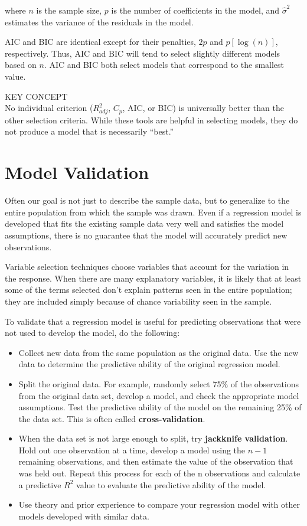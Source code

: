 \documentclass[
]{report}
\begin{document}
where \(n\) is the sample size, \(p\) is the number of coefficients in the model, and \(\hat{\sigma}^2\) estimates the variance of the residuals in the model.

AIC and BIC are identical except for their penalties, \(2p\) and \(p[\log(n)]\), respectively. Thus, AIC and BIC will tend to select slightly different models based on \(n\). AIC and BIC both select models that correspond to the smallest value.

KEY CONCEPT\\
No individual criterion (\(R^2_{adj}\), \(C_p\), AIC, or BIC) is universally better than the other selection criteria. While these tools are helpful in selecting models, they do not produce a model that is necessarily ``best.''

\hypertarget{model-validation}{%
\section*{Model Validation}\label{model-validation}}

Often our goal is not just to describe the sample data, but to generalize to the entire population from which the sample was drawn. Even if a regression model is developed that fits the existing sample data very well and satisfies the model assumptions, there is no guarantee that the model will accurately predict new observations.

Variable selection techniques choose variables that account for the variation in the response. When there are many explanatory variables, it is likely that at least some of the terms selected don't explain patterns seen in the entire population; they are included simply because of chance variability seen in the sample.

To validate that a regression model is useful for predicting observations that were not used to develop
the model, do the following:

\begin{itemize}
\item
  Collect new data from the same population as the original data. Use the new data to determine the
  predictive ability of the original regression model.
\item
  Split the original data. For example, randomly select 75\% of the observations from the original data
  set, develop a model, and check the appropriate model assumptions. Test the predictive ability of the
  model on the remaining 25\% of the data set. This is often called \textbf{cross-validation}.
\item
  When the data set is not large enough to split, try \textbf{jackknife validation}. Hold out one observation at a time, develop a model using the \(n-1\) remaining observations, and then estimate the value of the observation that was held out. Repeat this process for each of the n observations and calculate a predictive \(R^2\) value to evaluate the predictive ability of the model.
\item
  Use theory and prior experience to compare your regression model with other models developed with
  similar data.
\end{itemize}
\end{document}
